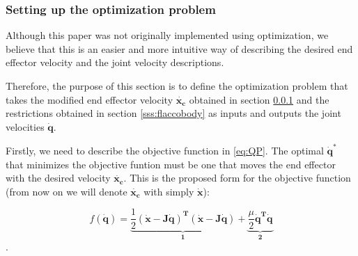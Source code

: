 \subsubsection{Setting up the optimization problem}
\label{sss:flaccorepulsive}

Although this paper was not originally implemented using optimization, we believe that this  is an easier and more intuitive way of describing the desired end effector velocity and the joint velocity descriptions.

Therefore, the purpose of this section is to define the optimization problem that takes the modified end effector velocity $\mathbf{\dot{x_c}}$ obtained in section \ref{sss:flaccorepulsive} and the restrictions obtained in section \ref{sss:flaccobody} as inputs and outputs the joint velocities $\dot{\mathbf{q}}$.

Firstly, we need to describe the objective function in \ref{eq:QP}. The optimal $\dot{\mathbf{q}}^*$ that minimizes the objective funtion must be one that moves the end effector with the desired velocity $\mathbf{\dot{x_c}}$. This is the proposed form for the objective function (from now on we will denote $\mathbf{\dot{x_c}}$ with simply $\mathbf{\dot{x}}$):

\begin{equation*}
    f(\dot{\mathbf{q}}) = \underbrace{\frac{1}{2} \mathbf{(\dot{x}-J\dot{q})^{T} (\dot{x}-J\dot{q})}}_\textbf{1} + \underbrace{\frac{\mu}{2} \mathbf{\dot{q}^{T} \dot{q}}}_\textbf{2}
\end{equation*}.

